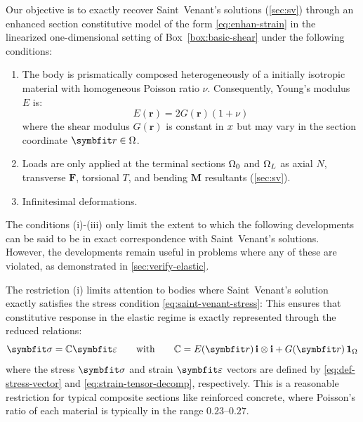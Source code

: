 Our objective is to exactly recover Saint~Venant's solutions (\cref{sec:sv}) through an enhanced section constitutive model of the form \eqref{eq:enhan-strain} in the linearized one-dimensional setting of Box~\ref{box:basic-shear} under the following conditions:
\begin{enumerate}[label=(\roman*)]
    \item The body is prismatically composed heterogeneously of a initially isotropic material with homogeneous Poisson ratio \(\nu\). Consequently, Young's modulus \(E\) is:
    \[
    E(\bm{r}) = 2G(\bm{r})(1+\nu)
    \]
    where the shear modulus \(G(\bm{r})\) is constant in \(x\) but may vary in the section coordinate \(\bm{r}\in\Section\). 
    \item Loads are only applied at the terminal sections \(\Omega_0\) and \(\Omega_L\) as axial \(N\), transverse \(\bm{F}\), torsional \(T\), and bending \(\bm{M}\) resultants (\cref{sec:sv}). 
    \item Infinitesimal deformations.
\end{enumerate}
\begin{remark}
The conditions (i)-(iii) only limit the extent to which the following developments can be said to be in exact correspondence with Saint~Venant's solutions. However, the developments remain useful in problems where any of these are violated, as demonstrated in \cref{sec:verify-elastic}.
\end{remark}
The restriction (i) limits attention to bodies where Saint~Venant's solution exactly satisfies the stress condition \eqref{eq:saint-venant-stress}:
This ensures that constitutive response in the elastic regime is exactly represented through the reduced relations:
\begin{equation*}
\bm{\sigma} = \mathbb{C}\bm{\varepsilon}
\qquad\text{with}\qquad 
\mathbb{C} = E(\bm{r}) \, \FrameBasis \otimes \FrameBasis + G(\bm{r}) \, \oneS
\end{equation*}
where the stress \(\StressVector\) and strain \(\StrainVector\) vectors are defined by \eqref{eq:def-stress-vector} and \eqref{eq:strain-tensor-decomp}, respectively. 
This is a reasonable restriction for typical composite sections like reinforced concrete, where Poisson's ratio of each material is typically in the range \(0.23\)--\(0.27\).

